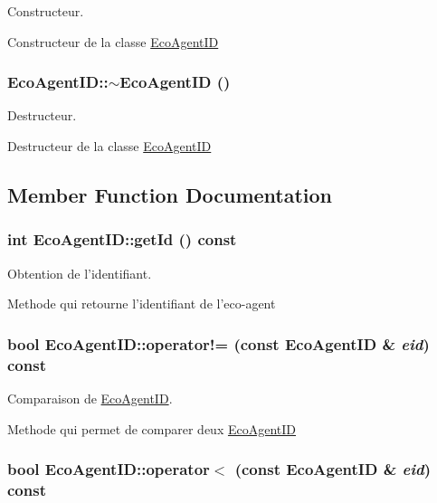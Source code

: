 Constructeur. 

Constructeur de la classe \hyperlink{classEcoAgentID}{EcoAgentID} \hypertarget{classEcoAgentID_97da1c0ae8891bbf10feb0574ef64a26}{
\subsubsection[{$\sim$EcoAgentID}]{\setlength{\rightskip}{0pt plus 5cm}EcoAgentID::$\sim$EcoAgentID ()}}
\label{classEcoAgentID_97da1c0ae8891bbf10feb0574ef64a26}


Destructeur. 

Destructeur de la classe \hyperlink{classEcoAgentID}{EcoAgentID} 

\subsection{Member Function Documentation}
\hypertarget{classEcoAgentID_30abc8a92bd07523b8e4f4baf312b56e}{
\subsubsection[{getId}]{\setlength{\rightskip}{0pt plus 5cm}int EcoAgentID::getId () const}}
\label{classEcoAgentID_30abc8a92bd07523b8e4f4baf312b56e}


Obtention de l'identifiant. 

Methode qui retourne l'identifiant de l'eco-agent \hypertarget{classEcoAgentID_8ffde7f02500120884ef35ade65b3e6e}{
\subsubsection[{operator!=}]{\setlength{\rightskip}{0pt plus 5cm}bool EcoAgentID::operator!= (const {\bf EcoAgentID} \& {\em eid}) const}}
\label{classEcoAgentID_8ffde7f02500120884ef35ade65b3e6e}


Comparaison de \hyperlink{classEcoAgentID}{EcoAgentID}. 

Methode qui permet de comparer deux \hyperlink{classEcoAgentID}{EcoAgentID} \hypertarget{classEcoAgentID_24d44b31302cd2761ffce1df8f74f12c}{
\subsubsection[{operator$<$}]{\setlength{\rightskip}{0pt plus 5cm}bool EcoAgentID::operator$<$ (const {\bf EcoAgentID} \& {\em eid}) const}}
\label{classEcoAgentID_24d44b31302cd2761ffce1df8f74f12c}


